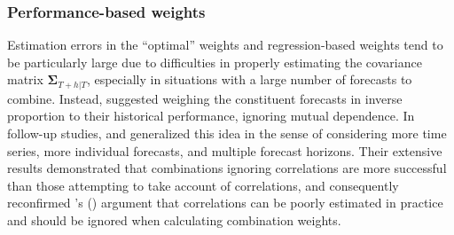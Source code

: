 \documentclass[a4paper,11pt]{article}
\def\citeapos#1{\citeauthor{#1}'s (\citeyear{#1})}
\begin{document}
\subsubsection*{Performance-based weights}

Estimation errors in the ``optimal'' weights and regression-based weights tend to be particularly large due to difficulties in properly estimating the covariance matrix $\bm{\Sigma}_{T+h|T}$, especially in situations with a large number of forecasts to combine. Instead, \citet{Bates1969-yj} suggested weighing the constituent forecasts in inverse proportion to their historical performance, ignoring mutual dependence. In follow-up studies, \citet{Newbold1974-lp} and \citet{Winkler1983-ra} generalized this idea in the sense of considering more time series, more individual forecasts, and multiple forecast horizons. Their extensive results demonstrated that combinations ignoring correlations are more successful than those attempting to take account of correlations, and consequently reconfirmed \citeapos{Bates1969-yj} argument that correlations can be poorly estimated in practice and should be ignored when calculating combination weights.
\end{document}

